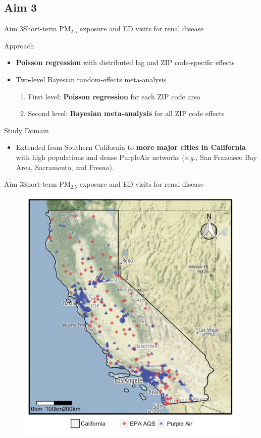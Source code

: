 \documentclass[handout]{beamer} %
\begin{document}
\subsection{Aim 3}
\begin{frame}{Aim 3}{Short-term PM$_{2.5}$ exposure and ED visits for renal disease}
    \begin{block}{Approach}
        \begin{itemize}
        \setlength{\belowdisplayskip}{-10pt}
            \item<1> \textbf{Poisson regression} with distributed lag and ZIP code-specific effects
            \item<2> Two-level Bayesian random-effects meta-analysis
                \begin{enumerate}
                \setlength{\belowdisplayskip}{-10pt}
                    \item First level: \textbf{Poisson regression} for each ZIP code area
                    \setlength{\belowdisplayskip}{-10pt}
                    \item Second level: \textbf{Bayesian meta-analysis} for all ZIP code effects
                \end{enumerate}
        \end{itemize}
    \end{block}
    \begin{block}{Study Domain}
        \begin{itemize}
        \item Extended from Southern California to \textbf{more major cities in California} with high populations and dense PurpleAir networks (\textit{e.g.,} San Francisco Bay Area, Sacramento, and Fresno).
        \end{itemize}
    \end{block}
\end{frame}

\begin{frame}{Aim 3}{Short-term PM$_{2.5}$ exposure and ED visits for renal disease}
    \begin{figure}
        \centering
        \includegraphics[height=0.6\textwidth]{img/ca.jpg}
        \label{fig:aim3}
    \end{figure}
\end{frame}
\end{document}
